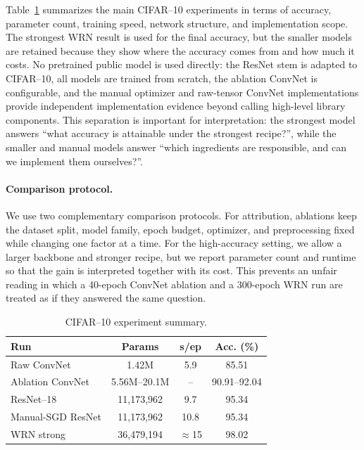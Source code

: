 \documentclass[11pt]{article}
\newcommand{\bestAcc}{98.02}     %
\newcommand{\bestParams}{36{,}479{,}194}
\newcommand{\baseAcc}{95.34}     %
\newcommand{\baseParams}{11{,}173{,}962}
\newcommand{\bestEpochTime}{9.7}
\newcommand{\manualEpochTime}{10.8}
\newcommand{\manualNetEpochTime}{5.9}
\newcommand{\wrnEpochTime}{15}
\newcommand{\manualAcc}{95.34}   %
\newcommand{\manualNetAcc}{85.51} %
\newcommand{\convAcc}{92.04}     %
\begin{document}
Table~\ref{tab:part1score} summarizes the main CIFAR--10 experiments in terms
of accuracy, parameter count, training speed, network structure, and
implementation scope. The strongest WRN result is used for the final accuracy,
but the smaller models are retained because they show where the accuracy comes
from and how much it costs. No pretrained public model is used directly: the
ResNet stem is adapted to CIFAR--10, all models are trained from scratch, the
ablation ConvNet is configurable, and the manual optimizer and raw-tensor
ConvNet implementations provide independent implementation evidence beyond
calling high-level library components.
This separation is important for interpretation: the strongest model answers
``what accuracy is attainable under the strongest recipe?'', while the smaller
and manual models
answer ``which ingredients are responsible, and can we implement them
ourselves?''.

\paragraph{Comparison protocol.}
We use two complementary comparison protocols. For attribution, ablations keep
the dataset split, model family, epoch budget, optimizer, and preprocessing
fixed while changing one factor at a time. For the high-accuracy setting, we allow a
larger backbone and stronger recipe, but we report parameter count and runtime
so that the gain is interpreted together with its cost. This prevents an
unfair reading in which a 40-epoch ConvNet ablation and a 300-epoch WRN run are
treated as if they answered the same question.

\begin{table}[htbp]
\centering
\small
\caption{CIFAR--10 experiment summary.}
\label{tab:part1score}
\begin{tabular}{lccc}
\toprule
Run & Params & s/ep & Acc. (\%) \\
\midrule
Raw ConvNet & 1.42M & \manualNetEpochTime{} & \manualNetAcc{} \\
Ablation ConvNet & 5.56M--20.1M & -- & 90.91--\convAcc{} \\
ResNet--18 & \baseParams{} & \bestEpochTime{} & \baseAcc{} \\
Manual-SGD ResNet & \baseParams{} & \manualEpochTime{} & \manualAcc{} \\
WRN strong & \bestParams{} & $\approx$\wrnEpochTime{} &
\bestAcc{} \\
\bottomrule
\end{tabular}
\end{table}
\end{document}
